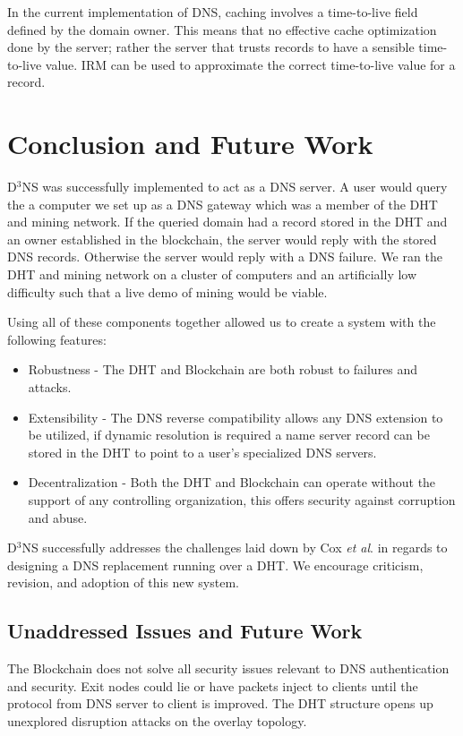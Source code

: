 In the current implementation of DNS, caching involves a time-to-live field defined by the domain owner. This means that no effective cache optimization done by the server; rather the server that trusts records to have a sensible time-to-live value. IRM \cite{irm} can be used to approximate the correct time-to-live value for a record.

\section{Conclusion and Future Work}
D$^3$NS was successfully implemented to act as a DNS server.  A user would query the a computer we set up as a DNS gateway which was a member of the DHT and mining network. If the queried domain had a record stored in the DHT and an owner established in the blockchain, the server would reply with the stored DNS records. Otherwise the server would reply with a DNS failure. We ran the DHT and mining network on a cluster of computers and an artificially low difficulty such that a live demo of mining would be viable.

Using all of these components together allowed us to create a system with the following features:
\begin{itemize}
	\item Robustness - The DHT and Blockchain are both robust to failures and attacks.
	\item Extensibility - The DNS reverse compatibility allows any DNS extension to be utilized, if dynamic resolution is required a name server record can be stored in the DHT to point to a user's specialized DNS servers.
	\item Decentralization - Both the DHT and Blockchain can operate without the support of any controlling organization, this offers security against corruption and abuse. 
\end{itemize}	

D$^3$NS successfully addresses the challenges laid down by Cox \textit{et al}. \cite{cox2002serving}  in regards to designing a DNS replacement running over a DHT.   We encourage criticism, revision, and adoption of this new system.

\subsection{Unaddressed Issues and Future Work}
The Blockchain does not solve all security issues relevant to DNS authentication and security. Exit nodes could lie or have packets inject to clients until the protocol from DNS server to client is improved. The DHT structure opens up unexplored disruption attacks on the overlay topology.

